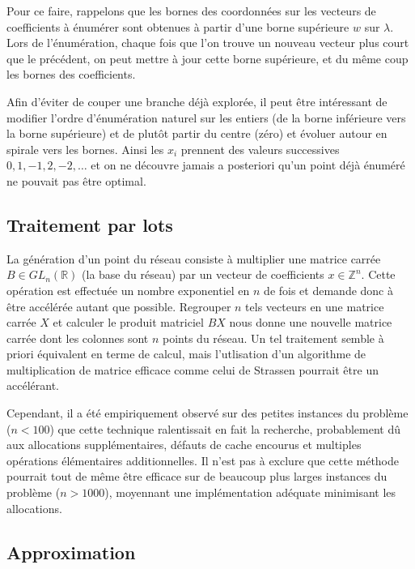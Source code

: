 \documentclass{article}
\begin{document}
Pour ce faire, rappelons que les bornes des coordonnées sur les vecteurs de coefficients à énumérer sont obtenues à partir d'une borne supérieure $w$ sur $\lambda$. Lors de l'énumération, chaque fois que l'on trouve un nouveau vecteur plus court que le précédent, on peut mettre à jour cette borne supérieure, et du même coup les bornes des coefficients.

Afin d'éviter de couper une branche déjà explorée, il peut être intéressant de modifier l'ordre d'énumération naturel sur les entiers (de la borne inférieure vers la borne supérieure) et de plutôt partir du centre (zéro) et évoluer autour en spirale vers les bornes. Ainsi les $x_i$ prennent des valeurs successives $0, 1, -1, 2, -2, \dots$ et on ne découvre jamais a posteriori qu'un point déjà énuméré ne pouvait pas être optimal.

\subsection{Traitement par lots}

La génération d'un point du réseau consiste à multiplier une matrice carrée $B \in GL_n(\mathbb{R})$ (la base du réseau) par un vecteur de coefficients $x \in \mathbb{Z}^n$. Cette opération est effectuée un nombre exponentiel en $n$ de fois et demande donc à être accélérée autant que possible. Regrouper $n$ tels vecteurs en une matrice carrée $X$ et calculer le produit matriciel $BX$ nous donne une nouvelle matrice carrée dont les colonnes sont $n$ points du réseau. Un tel traitement semble à priori équivalent en terme de calcul, mais l'utlisation d'un algorithme de multiplication de matrice efficace comme celui de Strassen pourrait être un accélérant.

Cependant, il a été empiriquement observé sur des petites instances du problème ($n < 100$) que cette technique ralentissait en fait la recherche, probablement dû aux allocations supplémentaires, défauts de cache encourus et multiples opérations élémentaires additionnelles. Il n'est pas à exclure que cette méthode pourrait tout de même être efficace sur de beaucoup plus larges instances du problème ($n > 1000$), moyennant une implémentation adéquate minimisant les allocations.

\newpage

\subsection{Approximation}
\end{document}

